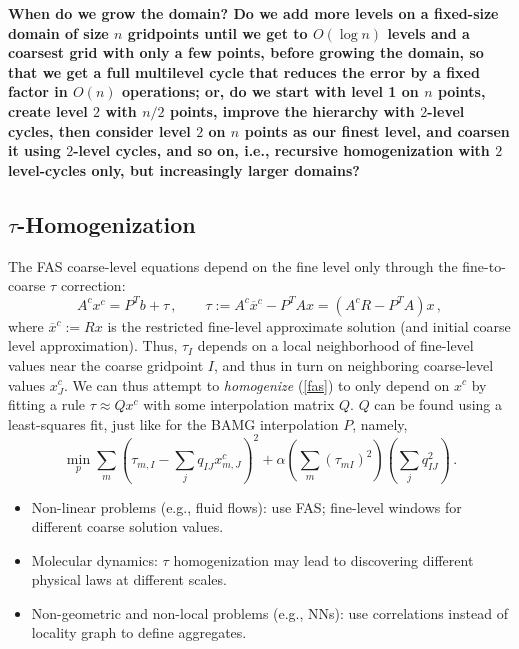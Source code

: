 \documentclass{article}
\begin{document}
{\bf When do we grow the domain? Do we add more levels on a fixed-size domain of size $n$ gridpoints until we get to $O(\log n)$ levels and a coarsest grid with only a few points, before growing the domain, so that we get a full multilevel cycle that reduces the error by a fixed factor in $O(n)$ operations; or, do we start with level 1 on $n$ points, create level $2$ with $n/2$ points, improve the hierarchy with $2$-level cycles, then consider level $2$ on $n$ points as our finest level, and coarsen it using $2$-level cycles, and so on, i.e., recursive homogenization with $2$ level-cycles only, but increasingly larger domains?}

\subsection{$\tau$-Homogenization}
\label{hom}
The FAS coarse-level equations depend on the fine level only through the fine-to-coarse $\tau$ correction:
\begin{equation}
	A^c x^c = P^T b + \tau\,,\qquad \tau :=  A^c \overline{x}^c - P^T A x = (A^c R - P^T A) x\,,
	\label{fas}
\end{equation}
where $\overline{x}^c := R x$ is the restricted fine-level approximate solution (and initial coarse level approximation). Thus, $\tau_I$ depends on a local neighborhood of fine-level values near the coarse gridpoint $I$, and thus in turn on neighboring coarse-level values $x^c_J$. We can thus attempt to \emph{homogenize} (\ref{fas}) to only depend on $x^c$  by fitting a rule $\tau \approx Q x^c$ with some interpolation matrix $Q$. $Q$ can be found using a least-squares fit, just like for the BAMG interpolation $P$, namely,
\begin{equation}
	\min_p \sum_m \left( \tau_{m,I} - \sum_j q_{IJ} x^c_{m,J} \right)^2 + \alpha \left( \sum_m (\tau_{mI})^2 \right) \left(\sum_j q_{IJ}^2\right) \,.
\end{equation}

\begin{itemize}
	\item Non-linear problems (e.g., fluid flows): use FAS; fine-level windows for different coarse solution values.
	\item Molecular dynamics: $\tau$ homogenization may lead to discovering different physical laws at different scales.
	\item Non-geometric and non-local problems (e.g., NNs): use correlations instead of locality graph to define aggregates.
\end{itemize}



\end{document}
